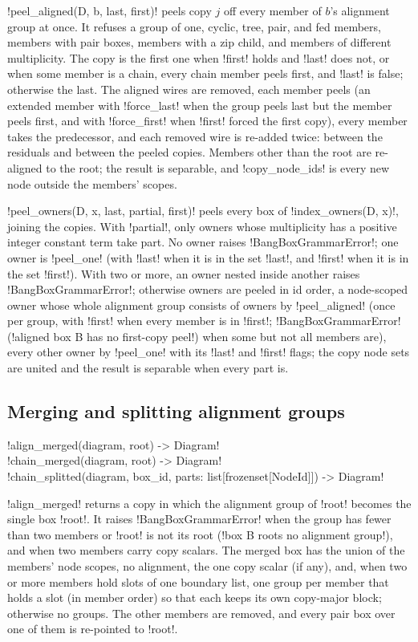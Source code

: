 \py!peel_aligned(D, b, last, first)! peels copy $j$ off every member of $b$'s alignment group at once. It refuses a group of one, cyclic, tree, pair, and fed members, members with pair boxes, members with a zip child, and members of different multiplicity. The copy is the first one when \py!first! holds and \py!last! does not, or when some member is a chain, every chain member peels first, and \py!last! is false; otherwise the last. The aligned wires are removed, each member peels (an extended member with \py!force_last! when the group peels last but the member peels first, and with \py!force_first! when \py!first! forced the first copy), every member takes the predecessor, and each removed wire is re-added twice: between the residuals and between the peeled copies. Members other than the root are re-aligned to the root; the result is separable, and \py!copy_node_ids! is every new node outside the members' scopes.

\py!peel_owners(D, x, last, partial, first)! peels every box of \py!index_owners(D, x)!, joining the copies. With \py!partial!, only owners whose multiplicity has a positive integer constant term take part. No owner raises \py!BangBoxGrammarError!; one owner is \py!peel_one! (with \py!last! when it is in the set \py!last!, and \py!first! when it is in the set \py!first!). With two or more, an owner nested inside another raises \py!BangBoxGrammarError!; otherwise owners are peeled in id order, a node-scoped owner whose whole alignment group consists of owners by \py!peel_aligned! (once per group, with \py!first! when every member is in \py!first!; \py!BangBoxGrammarError! (\code!aligned box B has no first-copy peel!) when some but not all members are), every other owner by \py!peel_one! with its \py!last! and \py!first! flags; the copy node sets are united and the result is separable when every part is.

\subsection{Merging and splitting alignment groups}

\begin{signature}
\py!align_merged(diagram, root) -> Diagram!\\
\py!chain_merged(diagram, root) -> Diagram!\\
\py!chain_splitted(diagram, box_id, parts: list[frozenset[NodeId]]) -> Diagram!
\end{signature}

\py!align_merged! returns a copy in which the alignment group of \py!root! becomes the single box \py!root!. It raises \py!BangBoxGrammarError! when the group has fewer than two members or \py!root! is not its root (\code!box B roots no alignment group!), and when two members carry copy scalars. The merged box has the union of the members' node scopes, no alignment, the one copy scalar (if any), and, when two or more members hold slots of one boundary list, one group per member that holds a slot (in member order) so that each keeps its own copy-major block; otherwise no groups. The other members are removed, and every pair box over one of them is re-pointed to \py!root!.


